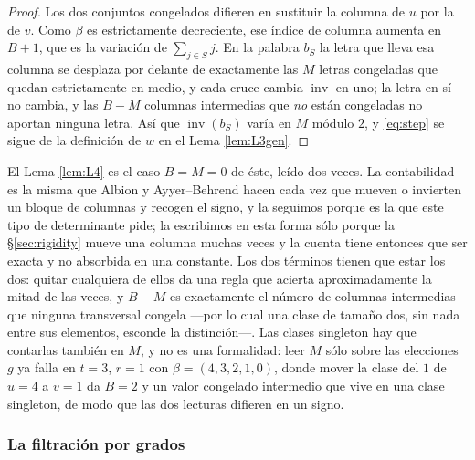 \documentclass[11pt,reqno]{amsart}
\theoremstyle{plain}
\theoremstyle{definition}
\newcommand{\inv}{\operatorname{inv}}
\begin{document}
\begin{proof}
Los dos conjuntos congelados difieren en sustituir la columna de $u$ por la de $v$. Como $\beta$ es
estrictamente decreciente, ese índice de columna aumenta en $B+1$, que es la variación de
$\sum_{j\in S}j$. En la palabra $b_S$ la letra que lleva esa columna se desplaza por delante de
exactamente las $M$ letras congeladas que quedan estrictamente en medio, y cada cruce cambia $\inv$
en uno; la letra en sí no cambia, y las $B-M$ columnas intermedias que \emph{no} están congeladas no
aportan ninguna letra. Así que $\inv(b_S)$ varía en $M$ módulo $2$, y \eqref{eq:step} se sigue de la
definición de $w$ en el Lema \ref{lem:L3gen}.
\end{proof}

\noindent El Lema \ref{lem:L4} es el caso $B=M=0$ de éste, leído dos veces. La contabilidad es la
misma que Albion \cite{Alb23,Alb25} y Ayyer--Behrend \cite{AB19} hacen cada vez que mueven o invierten
un bloque de columnas y recogen el signo, y la seguimos porque es la que este tipo de determinante
pide; la escribimos en esta forma sólo porque la \S\ref{sec:rigidity} mueve una columna muchas veces
y la cuenta tiene entonces que ser exacta y no absorbida en una constante. Los dos términos tienen
que estar los dos: quitar cualquiera de ellos da una regla que acierta aproximadamente la mitad de
las veces, y $B-M$ es exactamente el número de columnas intermedias que ninguna transversal congela
---por lo cual una clase de tamaño dos, sin nada entre sus elementos, esconde la distinción---. Las
clases singleton hay que contarlas también en $M$, y no es una formalidad: leer $M$ sólo sobre las
elecciones $g$ ya falla en $t=3$, $r=1$ con $\beta=(4,3,2,1,0)$, donde mover la clase del $1$ de
$u=4$ a $v=1$ da $B=2$ y un valor congelado intermedio que vive en una clase singleton, de modo que
las dos lecturas difieren en un signo.

\subsubsection*{La filtración por grados}
\end{document}
